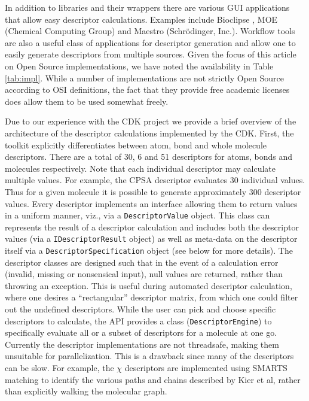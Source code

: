 \documentclass[letterpaper, 12pt]{article}
\begin{document}
In addition to libraries and their wrappers there are various GUI
applications that allow easy descriptor calculations. Examples include
Bioclipse \cite{Spjuth:2007aa}, MOE (Chemical Computing Group) and
Maestro (Schr\"{o}dinger, Inc.). Workflow tools are also a useful
class of applications for descriptor generation and allow one to
easily generate descriptors from multiple sources. Given the focus of
this article on Open Source implementations, we have noted the
availability in Table \ref{tab:impl}. While a number of
implementations are not strictly Open Source according to OSI
definitions, the fact that they provide free academic licenses does
allow them to be used somewhat freely.

Due to our experience with the CDK project we provide a brief overview
of the architecture of the descriptor calculations implemented by the
CDK. First, the toolkit explicitly differentiates between atom, bond
and whole molecule descriptors. There are a total of 30, 6 and 51
descriptors for atoms, bonds and molecules respectively. Note that
each individual descriptor may calculate multiple values. For example,
the CPSA descriptor evaluates 30 individual values. Thus for a given
molecule it is possible to generate approximately 300 descriptor
values. Every descriptor implements an interface allowing them to
return values in a uniform manner, viz., via a
\texttt{DescriptorValue} object. This class can represents the result
of a descriptor calculation and includes both the descriptor values
(via a \texttt{IDescriptorResult} object) as well as meta-data on the
descriptor itself via a \texttt{DescriptorSpecification} object (see
below for more details). The descriptor classes are designed such that
in the event of a calculation error (invalid, missing or nonsensical
input), null values are returned, rather than throwing an
exception. This is useful during automated descriptor calculation,
where one desires a ``rectangular'' descriptor matrix, from which one
could filter out the undefined descriptors. While the user can pick
and choose specific descriptors to calculate, the API provides a class
(\texttt{DescriptorEngine}) to specifically evaluate all or a subset
of descriptors for a molecule at one go.  Currently the descriptor
implementations are not threadsafe, making them unsuitable for
parallelization. This is a drawback since many of the descriptors can
be slow. For example, the $\chi$ descriptors \cite{Kier:1976aa} are
implemented using SMARTS matching to identify the various paths and
chains described by Kier et al, rather than explicitly walking the
molecular graph.
\end{document}
